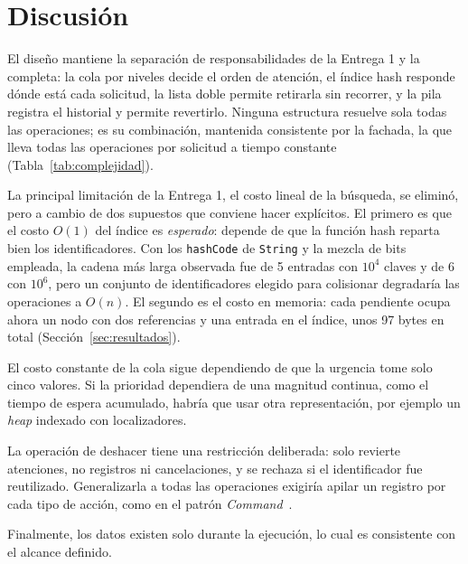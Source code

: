 \section{Discusión}
\label{sec:discusion}

El diseño mantiene la separación de responsabilidades de la Entrega 1 y la
completa: la cola por niveles decide el orden de atención, el índice hash
responde dónde está cada solicitud, la lista doble permite retirarla sin
recorrer, y la pila registra el historial y permite revertirlo. Ninguna
estructura resuelve sola todas las operaciones; es su combinación, mantenida
consistente por la fachada, la que lleva todas las operaciones por
solicitud a tiempo constante (Tabla~\ref{tab:complejidad}).

La principal limitación de la Entrega 1, el costo lineal de la búsqueda, se
eliminó, pero a cambio de dos supuestos que conviene hacer explícitos. El
primero es que el costo $O(1)$ del índice es \emph{esperado}: depende de que
la función hash reparta bien los identificadores. Con los
\texttt{hashCode} de \texttt{String} y la mezcla de bits empleada, la cadena
más larga observada fue de 5 entradas con $10^4$ claves y de 6 con
$10^6$, pero un
conjunto de identificadores elegido para colisionar degradaría las
operaciones a $O(n)$. El segundo es el costo en memoria: cada pendiente
ocupa ahora un nodo con dos referencias y una entrada en el índice, unos
97 bytes en total (Sección~\ref{sec:resultados}).

El costo constante de la cola sigue dependiendo de que la urgencia tome
solo cinco valores. Si la prioridad dependiera de una magnitud continua,
como el tiempo de espera acumulado, habría que usar otra representación,
por ejemplo un \emph{heap} indexado con localizadores.

La operación de deshacer tiene una restricción deliberada: solo revierte
atenciones, no registros ni cancelaciones, y se rechaza si el identificador
fue reutilizado. Generalizarla a todas las operaciones exigiría apilar un
registro por cada tipo de acción, como en el patrón
\emph{Command}~\cite{gof}.

Finalmente, los datos existen solo durante la ejecución, lo cual es
consistente con el alcance definido.
